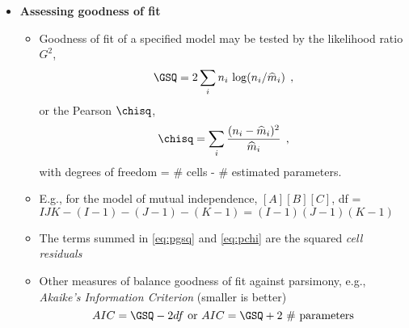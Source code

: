 \begin{frame}[allowframebreaks]
\begin{itemize}
\framebreak
	\item{\large\bfseries Assessing goodness of fit}
    	\begin{itemize}
		\item Goodness of fit of a specified model may be tested by the likelihood ratio $G^2$,
\begin{equation}\label{eq:pgsq}
\GSQ =  2 \sum_i n_i \, \log ( n_i / \widehat{m}_i )
\comma
\end{equation}
		or the Pearson $\chisq$,
\begin{equation}\label{eq:pchi}
\chisq = \sum_i \frac{( n_i - \widehat{m}_i )^2}{\widehat{m}_i}
\comma
\end{equation}
	with degrees of freedom = \# cells - \#  estimated parameters.  
	\item E.g., for the model
	of mutual independence, $[A] [B] [C]$, df = $IJK - (I-1) - (J-1) - (K-1) = (I-1)(J-1)(K-1)$
	\item The terms summed in \eqref{eq:pgsq} and \eqref{eq:pchi} are the squared \emph{cell residuals}
	\item Other measures of balance goodness of fit against parsimony, e.g., \emph{Akaike's Information Criterion}
	(smaller is better)
	\[ AIC = \GSQ - 2 df \mbox{ or }  AIC = \GSQ + 2 \mbox{ \# parameters} \]
		\end{itemize}
  \end{itemize}
\end{frame}

\endinput

\begin{frame}
  \frametitle{}
  \begin{itemize}
	\item{\large\bfseries }
      \begin{itemize*}
	  \item 
    	\begin{itemize*}
		\item 
		\item 
		\end{itemize*}
	  \item 
	  \end{itemize*}
	\item{\large\bfseries }
	\item{\large\bfseries }
  \end{itemize}
\end{frame}

